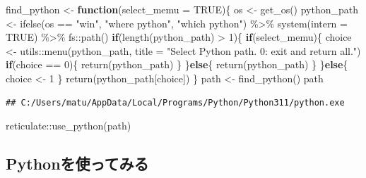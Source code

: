 \documentclass[
]{article}
\newenvironment{Shaded}{\begin{snugshade}}{\end{snugshade}}
\newcommand{\AttributeTok}[1]{\textcolor[rgb]{0.77,0.63,0.00}{#1}}
\newcommand{\ConstantTok}[1]{\textcolor[rgb]{0.00,0.00,0.00}{#1}}
\newcommand{\ControlFlowTok}[1]{\textcolor[rgb]{0.13,0.29,0.53}{\textbf{#1}}}
\newcommand{\DecValTok}[1]{\textcolor[rgb]{0.00,0.00,0.81}{#1}}
\newcommand{\FunctionTok}[1]{\textcolor[rgb]{0.00,0.00,0.00}{#1}}
\newcommand{\NormalTok}[1]{#1}
\newcommand{\OtherTok}[1]{\textcolor[rgb]{0.56,0.35,0.01}{#1}}
\newcommand{\SpecialCharTok}[1]{\textcolor[rgb]{0.00,0.00,0.00}{#1}}
\newcommand{\StringTok}[1]{\textcolor[rgb]{0.31,0.60,0.02}{#1}}
\begin{document}
\begin{Shaded}
\begin{Highlighting}[]
\NormalTok{find\_python }\OtherTok{\textless{}{-}} \ControlFlowTok{function}\NormalTok{(}\AttributeTok{select\_memu =} \ConstantTok{TRUE}\NormalTok{)\{}
\NormalTok{  os }\OtherTok{\textless{}{-}} \FunctionTok{get\_os}\NormalTok{()}
\NormalTok{  python\_path }\OtherTok{\textless{}{-}} 
    \FunctionTok{ifelse}\NormalTok{(os }\SpecialCharTok{==} \StringTok{"win"}\NormalTok{, }\StringTok{"where python"}\NormalTok{, }\StringTok{"which python"}\NormalTok{) }\SpecialCharTok{\%\textgreater{}\%}
    \FunctionTok{system}\NormalTok{(}\AttributeTok{intern =} \ConstantTok{TRUE}\NormalTok{) }\SpecialCharTok{\%\textgreater{}\%}
\NormalTok{    fs}\SpecialCharTok{::}\FunctionTok{path}\NormalTok{()}
  \ControlFlowTok{if}\NormalTok{(}\FunctionTok{length}\NormalTok{(python\_path) }\SpecialCharTok{\textgreater{}} \DecValTok{1}\NormalTok{)\{}
    \ControlFlowTok{if}\NormalTok{(select\_memu)\{}
\NormalTok{      choice }\OtherTok{\textless{}{-}}\NormalTok{ utils}\SpecialCharTok{::}\FunctionTok{menu}\NormalTok{(python\_path, }\AttributeTok{title =} \StringTok{"Select Python path. 0: exit and return all."}\NormalTok{)}
      \ControlFlowTok{if}\NormalTok{(choice }\SpecialCharTok{==} \DecValTok{0}\NormalTok{)\{ }\FunctionTok{return}\NormalTok{(python\_path) \}}
\NormalTok{    \}}\ControlFlowTok{else}\NormalTok{\{}
      \FunctionTok{return}\NormalTok{(python\_path)}
\NormalTok{    \}}
\NormalTok{  \}}\ControlFlowTok{else}\NormalTok{\{}
\NormalTok{    choice }\OtherTok{\textless{}{-}} \DecValTok{1}
\NormalTok{  \}}
  \FunctionTok{return}\NormalTok{(python\_path[choice])}
\NormalTok{\}}
\NormalTok{path }\OtherTok{\textless{}{-}} \FunctionTok{find\_python}\NormalTok{()}
\NormalTok{path}
\end{Highlighting}
\end{Shaded}

\begin{verbatim}
## C:/Users/matu/AppData/Local/Programs/Python/Python311/python.exe
\end{verbatim}

\begin{Shaded}
\begin{Highlighting}[]
\NormalTok{reticulate}\SpecialCharTok{::}\FunctionTok{use\_python}\NormalTok{(path)}
\end{Highlighting}
\end{Shaded}

\hypertarget{pythonux3092ux4f7fux3063ux3066ux307fux308b}{%
\subsection{Pythonを使ってみる}\label{pythonux3092ux4f7fux3063ux3066ux307fux308b}}
\end{document}
